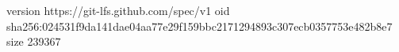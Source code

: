 version https://git-lfs.github.com/spec/v1
oid sha256:024531f9da141dae04aa77e29f159bbc2171294893c307ecb0357753e482b8e7
size 239367
